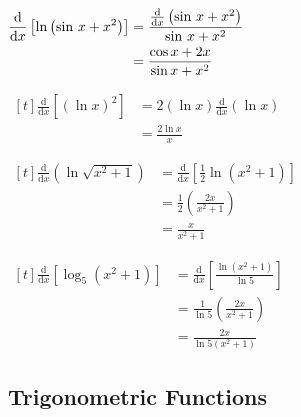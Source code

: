 \documentclass[11pt,a4paper]{book}
\begin{document}
\begin{example}
\begin{tasks}[label=(\alph*),label-width=3.5ex,after-item-skip = .5cm]
\task
$
\begin{aligned}[t]
{\displaystyle \frac{\mathrm{d}}{\mathrm{d}x}\left[\ln\left(\sin\thinspace x+x^{2}\right)\right]} & =\frac{\frac{\mathrm{d}}{\mathrm{d}x}\left(\sin\thinspace x+x^{2}\right)}{\sin\thinspace x+x^{2}}\\
 & =\frac{\cos x+2x}{\sin x+x^{2}}
\end{aligned}
$



\task
$
\begin{aligned}[t]
{\displaystyle \frac{\mathrm{d}}{\mathrm{d}x}\left[\left(\ln x\right)^{2}\right]} & =2\left(\ln x\right)\frac{\mathrm{d}}{\mathrm{d}x}\left(\ln x\right)\\
 & =\frac{2\ln x}{x}
\end{aligned}
$

\task
$
\begin{aligned}[t]
\frac{\mathrm{d}}{\mathrm{d}x}\left(\ln\sqrt{x^{2}+1}\right) & =\frac{\mathrm{d}}{\mathrm{d}x}\left[\frac{1}{2}\ln\left(x^{2}+1\right)\right]\\
 & =\frac{1}{2}\left(\frac{2x}{x^{2}+1}\right)\\
 & =\frac{x}{x^{2}+1}
\end{aligned}
$

\task
$
\begin{aligned}[t]
\frac{\mathrm{d}}{\mathrm{d}x}\left[\log_{5}\left(x^{2}+1\right)\right] & =\frac{\mathrm{d}}{\mathrm{d}x}\left[\frac{\ln\left(x^{2}+1\right)}{\ln5}\right]\\
 & =\frac{1}{\ln5}\left(\frac{2x}{x^{2}+1}\right)\\
 & =\frac{2x}{\ln5\left(x^{2}+1\right)}
\end{aligned}
$

\end{tasks}

\end{example}

\newpage

\subsection{Trigonometric Functions}
\end{document}
